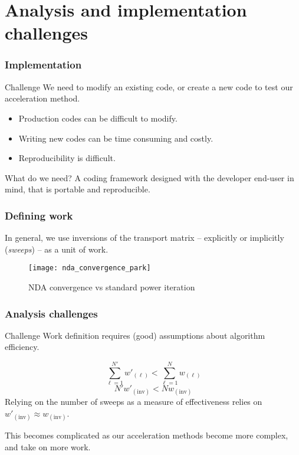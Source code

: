 \documentclass[xcolor=x11names, compress]{beamer}
\begin{document}
\section{Analysis and implementation challenges}

\begin{frame}
  \frametitle{Implementation}
  \pause
  \begin{block}{Challenge}
    We need to modify an existing code, or create a new code to test
    our acceleration method.
  \end{block}
  \pause\vspace{1em}
  \begin{itemize}[<+->]
  \item Production codes can be difficult to modify. %
  \item Writing new codes can be time consuming and costly. %
  \item Reproducibility is difficult.
  \end{itemize}\vspace{1em}
  \pause
  \begin{block}{What do we need?}
    A coding framework designed with the developer end-user in mind, that is portable and reproducible.
  \end{block}
\end{frame}

\begin{frame}
  \frametitle{Defining work}
  \pause
  In general, we use inversions of the transport matrix
  -- explicitly or implicitly (\textit{sweeps}) --  as a unit of work.
  \begin{figure}[H]
    \centering
    \texttt{[image: nda\_convergence\_park]}
    \caption{NDA convergence vs standard power iteration~\cite{Park2012}\label{fig:nda_convergence}}
  \end{figure}
\end{frame}

\begin{frame}
  \frametitle{Analysis challenges}
  \pause
  \begin{block}{Challenge}
    Work definition requires (good) assumptions about algorithm efficiency.
  \end{block}
  \pause
    \begin{equation*}
    \sum_{\ell = 1}^{N'}w'_{(\ell)} <  \sum_{\ell = 1}^Nw_{(\ell)}
  \end{equation*}
  \pause
    \begin{equation*}
    N'w'_{(\text{inv})} <  Nw_{{(\text{inv})}}
  \end{equation*}
  \pause
  Relying on the number of sweeps as a measure of effectiveness relies
  on $w'_{(\text{inv})} \approx  w_{{(\text{inv})}}$.
  \pause
  \begin{block}{}
    This becomes complicated as our acceleration methods become more
    complex, and take on more work.
  \end{block}
\end{frame}
\end{document}
